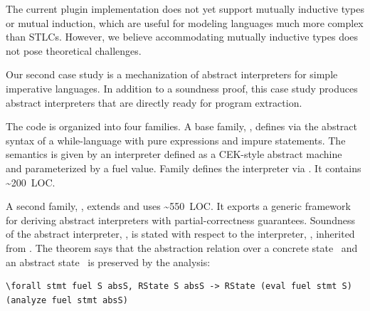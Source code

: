 The current plugin implementation does not yet support
mutually inductive types or mutual induction, which are
useful for modeling languages much more complex than STLCs.
However,
we believe accommodating mutually inductive types does
not pose theoretical challenges.



Our second case study is a mechanization of abstract interpreters
for simple imperative languages.
In addition to a soundness proof, this case study produces abstract
interpreters that are directly ready for program extraction.

The code is organized into four families.
A base family, , defines via  the abstract
syntax of a while-language with pure expressions and impure statements.
The semantics is given by an interpreter defined as a CEK-style abstract
machine~\cite{felleisen1986control} and parameterized by a fuel value.
Family  defines the interpreter via .
It contains \textasciitilde 200~LOC.

A second family, , extends  and uses
\textasciitilde 550~LOC.
It exports a generic framework for deriving
abstract interpreters with partial-correctness guarantees.
Soundness of the abstract interpreter, ,
is stated with respect to the interpreter, , inherited from .
The theorem says that the abstraction relation  over a
concrete state~ and an abstract state~ is preserved
by the analysis:

\begin{centered}
\begin{minipage}{.91\textwidth}
\begin{lstlisting}[basicstyle=\fontsize{8.25}{9}\ttfamily]
\forall stmt fuel S absS, RState S absS -> RState (eval fuel stmt S) (analyze fuel stmt absS)
\end{lstlisting}
\end{minipage}
\end{centered}

